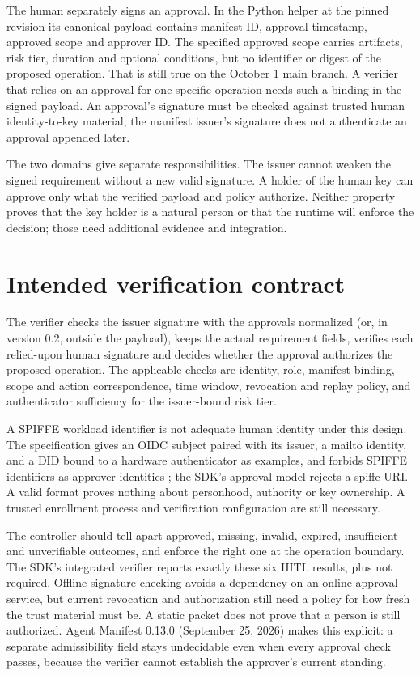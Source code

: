 \documentclass[10pt,letterpaper]{article}
\begin{document}
The human separately signs an approval. In the Python helper at the pinned revision its canonical payload contains manifest ID, approval timestamp, approved scope and approver ID. The specified approved scope carries artifacts, risk tier, duration and optional conditions, but no identifier or digest of the proposed operation. That is still true on the October 1 main branch. A verifier that relies on an approval for one specific operation needs such a binding in the signed payload. An approval's signature must be checked against trusted human identity-to-key material; the manifest issuer's signature does not authenticate an approval appended later.


The two domains give separate responsibilities. The issuer cannot weaken the signed requirement without a new valid signature. A holder of the human key can approve only what the verified payload and policy authorize. Neither property proves that the key holder is a natural person or that the runtime will enforce the decision; those need additional evidence and integration.


\section{Intended verification contract}

The verifier checks the issuer signature with the approvals normalized (or, in version 0.2, outside the payload), keeps the actual requirement fields, verifies each relied-upon human signature and decides whether the approval authorizes the proposed operation. The applicable checks are identity, role, manifest binding, scope and action correspondence, time window, revocation and replay policy, and authenticator sufficiency for the issuer-bound risk tier.


A SPIFFE workload identifier is not adequate human identity under this design. The specification gives an OIDC subject paired with its issuer, a mailto identity, and a DID bound to a hardware authenticator as examples, and forbids SPIFFE identifiers as approver identities \cite{ref3}; the SDK's approval model rejects a spiffe URI. A valid format proves nothing about personhood, authority or key ownership. A trusted enrollment process and verification configuration are still necessary.


The controller should tell apart approved, missing, invalid, expired, insufficient and unverifiable outcomes, and enforce the right one at the operation boundary. The SDK's integrated verifier reports exactly these six HITL results, plus not required. Offline signature checking avoids a dependency on an online approval service, but current revocation and authorization still need a policy for how fresh the trust material must be. A static packet does not prove that a person is still authorized. Agent Manifest 0.13.0 (September 25, 2026) makes this explicit: a separate admissibility field stays undecidable even when every approval check passes, because the verifier cannot establish the approver's current standing.
\end{document}
